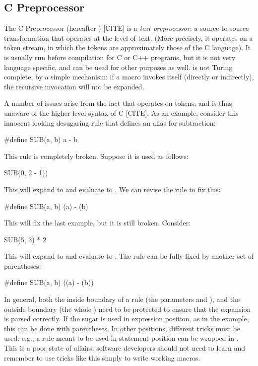 \subsection{C Preprocessor} \label{sec:taxonomy-cpre}

The C Preprocessor (hereafter ) [CITE] is a \emph{text
  preprocessor}: a source-to-source transformation that operates at
the level of text. (More precisely, it operates on a token stream, in
which the tokens are approximately those of the C language). It is
usually run before compilation for C or C++ programs, but it is not
very language specific, and can be used for other purposes as well.
 is not Turing complete, by a simple mechanism: if a macro
invokes itself (directly or indirectly), the recursive invocation
will not be expanded.

A number of issues arise from the fact that  operates on tokens, and
is thus unaware of the higher-level syntax of C [CITE].
As an example, consider this innocent looking
 desugaring rule that defines an alias for subtraction:
\begin{Codes}
  #define SUB(a, b) a - b
\end{Codes}
This rule is completely broken. Suppose it is used as follows:
\begin{Codes}
  SUB(0, 2 - 1))
\end{Codes}
This will expand to  and evaluate to .
We can revise the rule to fix this:
\begin{Codes}
  #define SUB(a, b) (a) - (b)
\end{Codes}
This will fix the last example, but it is still broken. Consider:
\begin{Codes}
  SUB(5, 3) * 2
\end{Codes}
This will expand to  and evaluate to .
The rule can be fully fixed by another set of parentheses:
\begin{Codes}
  #define SUB(a, b) ((a) - (b))
\end{Codes}
In general, both the inside boundary of a rule (the parameters 
and ), and the outside boundary (the whole ) need
to be protected to ensure that the expansion is parsed correctly. If
the sugar is used in expression position, as in the 
example, this can be done with parentheses. In other positions,
different tricks must be used: e.g., a rule meant to be used in
statement position can be wrapped in .
This is a poor state of affairs: software developers should not need
to learn and remember to use tricks like this simply to write working
macros.


